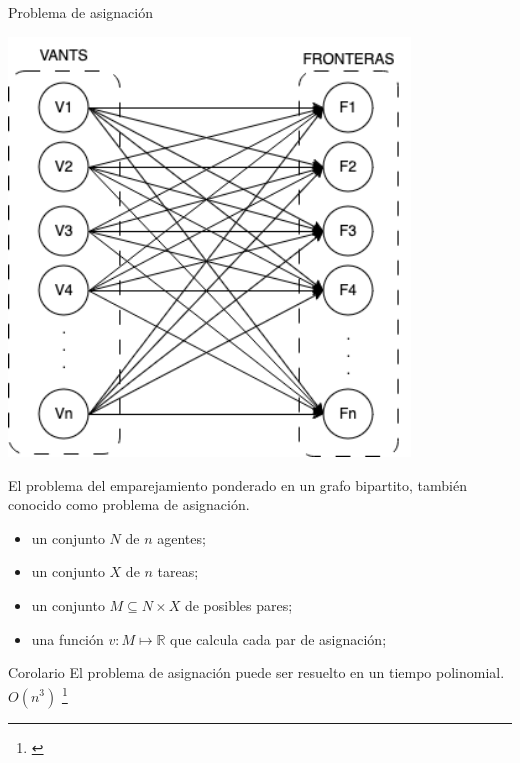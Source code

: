 \documentclass[
  24pt, %
  aspectratio=169, %
]{beamer}
\begin{document}
\begin{frame}{Problema de asignación}
  \begin{minipage}{0.48\textwidth}
    \includegraphics[width=0.8\textwidth]{asignacion}%
  \end{minipage}
  \begin{minipage}{0.51\textwidth}

    El problema del emparejamiento ponderado en un grafo bipartito, también conocido como problema de asignación.
    
    \begin{itemize}
    \item un conjunto $N$ de $n$ agentes;
    \item un conjunto $X$ de $n$ tareas;
    \item un conjunto $M \subseteq N \times X$ de posibles pares;
    \item una función $v : M \mapsto \mathbb{R}$ que calcula cada par de asignación;
    \end{itemize}
    \begin{block}{Corolario}
      El problema de asignación puede ser resuelto en un tiempo polinomial. $O(n^{3})$ \footnote{\cite{multi-book}}
    \end{block}
  \end{minipage}
\end{frame}
\end{document}
